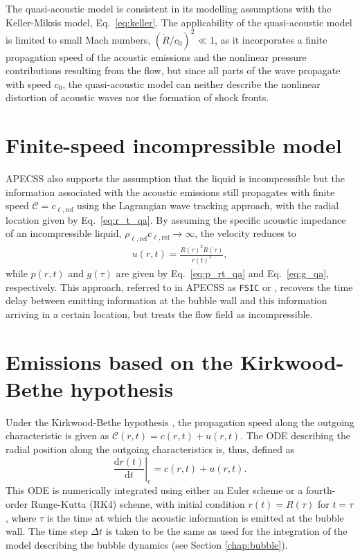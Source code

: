 The quasi-acoustic model is consistent in its modelling assumptions with the Keller-Miksis model, Eq.~\eqref{eq:keller}. The applicability of the quasi-acoustic model is limited to small Mach numbers, $(\dot{R}/c_0)^2 \ll 1$, as it incorporates a finite propagation speed of the acoustic emissions and the nonlinear pressure contributions resulting from the flow, but since all parts of the wave propagate with speed $c_0$, the quasi-acoustic model can neither describe the nonlinear distortion of acoustic waves nor the formation of shock fronts. 

\section{Finite-speed incompressible model}
\label{sec:emissionsfsic}

APECSS also supports the assumption that the liquid is incompressible but the information associated with the acoustic emissions still propagates with finite speed $\mathcal{C} = c_{\ell,\mathrm{ref}}$ using the Lagrangian wave tracking approach, with the radial location given by Eq.~\eqref{eq:r_t_qa}.
By assuming the specific acoustic impedance of an incompressible liquid, $\rho_{\ell,\mathrm{ref}} c_{\ell,\mathrm{ref}} \rightarrow \infty$, the velocity reduces to
\begin{align}
    u(r,t) = \frac{R(\tau)^2 \dot{R}(\tau)}{r(t)^2}, \label{eq:u_rt_fsic} 
\end{align}
while $p(r,t)$ and $g(\tau)$ are given by Eq.~\eqref{eq:p_rt_qa} and Eq.~\eqref{eq:g_qa}, respectively.
This approach, referred to in APECSS as {\tt FSIC} or , recovers the time delay between emitting information at the bubble wall and this information arriving in a certain location, but treats the flow field as incompressible.

\section{Emissions based on the Kirkwood-Bethe hypothesis}
\label{sec:emissionskb}

Under the Kirkwood-Bethe hypothesis \citep{Kirkwood1942,Cole1948}, the propagation speed along the outgoing characteristic is given as $\mathcal{C}(r,t) = c(r,t) + u(r,t)$. The ODE describing the radial position along the outgoing characteristics is, thus, defined as 
\begin{equation}
    \left. \frac{\mathrm{d}r(t)}{\mathrm{d}t} \right|_\text{c} = c(r,t) + u(r,t). \label{eq:drdt}
\end{equation}
This ODE is numerically integrated using either an Euler scheme or a fourth-order Runge-Kutta (RK4) scheme, with initial condition $r(t) = R(\tau)$ for $t=\tau$, where $\tau$ is the time at which the acoustic information is emitted at the bubble wall. The time step $\Delta t$ is taken to be the same as used for the integration of the model describing the bubble dynamics (see Section \ref{chap:bubble}).

